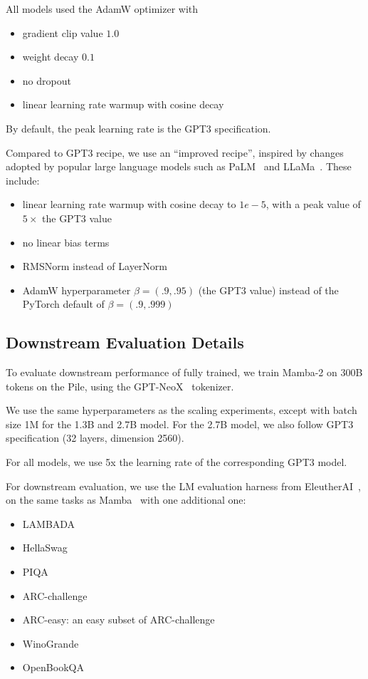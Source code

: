 \documentclass{article}
\newcommand{\citep}{\parencite}
\begin{document}
All models used the AdamW optimizer with
\begin{itemize}
  \item gradient clip value $1.0$
  \item weight decay $0.1$
  \item no dropout
  \item linear learning rate warmup with cosine decay
\end{itemize}
By default, the peak learning rate is the GPT3 specification.

Compared to GPT3 recipe, we use an ``improved recipe'', inspired by changes adopted by popular large language models such as PaLM~\citep{chowdhery2022palm} and LLaMa~\citep{touvron2023llama}.
These include:
\begin{itemize}
  \item linear learning rate warmup with cosine decay to $1e-5$, with a peak value of $5\times$ the GPT3 value
  \item no linear bias terms
  \item RMSNorm instead of LayerNorm
  \item AdamW hyperparameter $\beta=(.9, .95)$ (the GPT3 value) instead of the PyTorch default of $\beta=(.9, .999)$
\end{itemize}

\subsection{Downstream Evaluation Details}

To evaluate downstream performance of fully trained, we train Mamba-2 on 300B tokens on the Pile, using the GPT-NeoX~\citep{black2022gpt} tokenizer.

We use the same hyperparameters as the scaling experiments, except with batch
size 1M for the 1.3B and 2.7B model.
For the 2.7B model, we also follow GPT3 specification (32 layers, dimension 2560).

For all models, we use 5x the learning rate of the corresponding GPT3 model.

For downstream evaluation, we use the LM evaluation harness from EleutherAI~\citep{eval-harness}, on the same tasks as Mamba~\citep{gu2023mamba} with one additional one:
\begin{itemize}
  \item LAMBADA~\citep{paperno2016lambada}
  \item HellaSwag~\citep{zellers2019hellaswag}
  \item PIQA~\citep{bisk2020piqa}
  \item ARC-challenge~\citep{clark2018think}
  \item ARC-easy: an easy subset of ARC-challenge
  \item WinoGrande~\citep{sakaguchi2021winogrande}
  \item OpenBookQA~\citep{mihaylov2018can}
\end{itemize}
\end{document}
